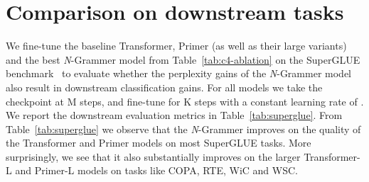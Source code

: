 \documentclass[11pt]{article}
\begin{document}
\section{Comparison on downstream tasks}\label{sec:super-glue}
We fine-tune the baseline Transformer, Primer (as well as their 
large variants) and the best \textit{N}-Grammer model from 
Table~\ref{tab:c4-ablation}
on the SuperGLUE benchmark~\citep{wang2019superglue} to evaluate
whether the perplexity gains of the \textit{N}-Grammer model
also result in downstream classification gains.
For all models we take the checkpoint at M steps,
and fine-tune for K steps with a constant learning
rate of . We report the downstream evaluation
metrics in Table~\ref{tab:superglue}. 
From Table~\ref{tab:superglue} we observe that the \textit{N}-Grammer
improves on the quality of the Transformer and Primer models on most 
SuperGLUE tasks. More surprisingly, we see that it also substantially
improves on the larger Transformer-L and Primer-L models on tasks like
COPA, RTE, WiC and WSC.
\begin{table*}[htbp]
\centering
{}
\caption{Fine-tuning results on 
    SuperGLUE~\citep{wang2019superglue} comparing the 
    Transformer, Primer and the best \textit{N}-Grammer
    model from Table~\ref{tab:c4-ablation}. The 
    \textit{N}-Grammer model has a discrete latent vocabulary
    of size K and a \textit{n}-gram vocabulary of
    size K. For all models we take the pre-trained 
    checkpoint at 1M steps and 
    fine-tune for K steps with a constant
    learning rate of .}
    \label{tab:superglue}
\end{table*}
\end{document}

